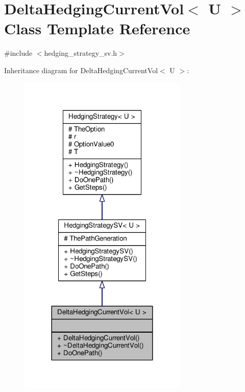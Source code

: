 \hypertarget{classDeltaHedgingCurrentVol}{}\section{Delta\+Hedging\+Current\+Vol$<$ U $>$ Class Template Reference}
\label{classDeltaHedgingCurrentVol}


{\ttfamily \#include $<$hedging\+\_\+strategy\+\_\+sv.\+h$>$}



Inheritance diagram for Delta\+Hedging\+Current\+Vol$<$ U $>$\+:
\nopagebreak
\begin{figure}[H]
\begin{center}
\leavevmode
\includegraphics[width=228pt]{classDeltaHedgingCurrentVol__inherit__graph}
\end{center}
\end{figure}


